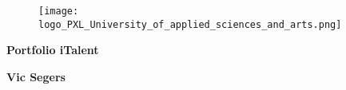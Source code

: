 \begin{titlepage}
  \vspace*{4cm}
  \begin{figure}[h!]
    \centering
    \texttt{[image: logo\_PXL\_University\_of\_applied\_sciences\_and\_arts.png]}
  \end{figure}
  \vspace*{3cm}
  \begin{center}
    \Huge\textbf{\textcolor{pxlgreen}{Portfolio iTalent}}
  \end{center}
  \vspace{0.5cm}
  \begin{center}
    \Large\textbf{Vic Segers}
  \end{center}
  \vfill
\end{titlepage}
